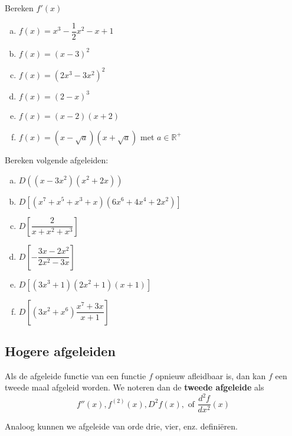 \documentclass[a4paper,12pt,twoside]{article}
\begin{document}
\begin{oefening}
  Bereken $f'(x)$
  \begin{multicols}{2}
    \begin{enumerate}[(a)]
      \itemsep.5em
    \item $f(x)=x^3-\dfrac{1}{2}x^2-x+1$
    \item $f(x)=\left(x-3\right)^2$
    \item $f(x)=\left(2x^3-3x^2\right)^2$
    \item $f(x)=\left(2-x\right)^3$
    \item $f(x)=\left(x-2\right)\left(x+2\right)$
    \item $f(x)=\left(x-\sqrt{a}\right)\left(x+\sqrt{a}\right)$ met $a\in\mathbb{R}^+$
    \end{enumerate}
  \end{multicols}
\end{oefening}

\begin{oefening}
  Bereken volgende afgeleiden:
  \begin{multicols}{2}
  \begin{enumerate}[(a)]
  \itemsep1em
  \item $D\left((x-3x^2)(x^2+2x)\right)$
  \item $D\left[(x^7+x^5+x^3+x)(6x^6+4x^4+2x^2)\right]$
  \item $D\left[\dfrac{2}{x+x^2+x^3}\right]$
  \item $D\left[-\dfrac{3x-2x^2}{2x^2-3x}\right]$
  \item $D\left[(3x^3+1)(2x^2+1)(x+1)\right]$
  \item $D\left[(3x^2+x^6)\dfrac{x^7+3x}{x+1}\right]$
  \end{enumerate}
  \end{multicols}
\end{oefening}

\subsection{Hogere afgeleiden}

Als de afgeleide functie van een functie $f$ opnieuw afleidbaar is, dan kan $f$ een tweede maal afgeleid worden. We noteren dan de {\bf tweede afgeleide} als
$$f''(x), f^{(2)}(x), D^2f(x), \mbox{ of } \dfrac{d^2f}{dx^2}(x)$$

Analoog kunnen we afgeleide van orde drie, vier, enz. definiëren.
\end{document}

